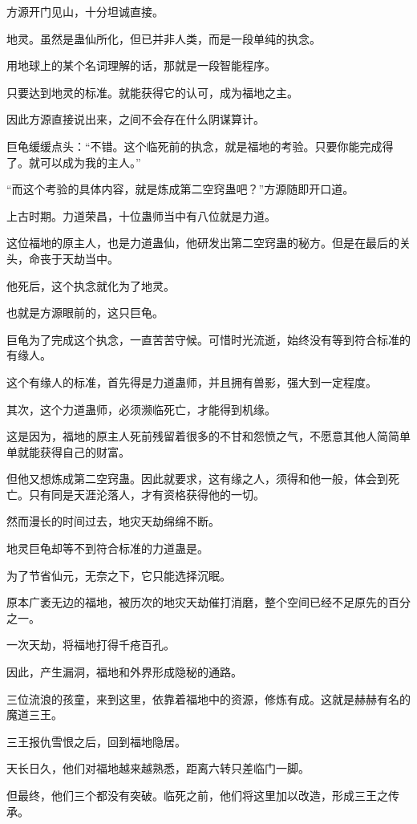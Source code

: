 \begin{this_body}
方源开门见山，十分坦诚直接。

地灵。虽然是蛊仙所化，但已并非人类，而是一段单纯的执念。

用地球上的某个名词理解的话，那就是一段智能程序。

只要达到地灵的标准。就能获得它的认可，成为福地之主。

因此方源直接说出来，之间不会存在什么阴谋算计。

巨龟缓缓点头：“不错。这个临死前的执念，就是福地的考验。只要你能完成得了。就可以成为我的主人。”

“而这个考验的具体内容，就是炼成第二空窍蛊吧？”方源随即开口道。

上古时期。力道荣昌，十位蛊师当中有八位就是力道。

这位福地的原主人，也是力道蛊仙，他研发出第二空窍蛊的秘方。但是在最后的关头，命丧于天劫当中。

他死后，这个执念就化为了地灵。

也就是方源眼前的，这只巨龟。

巨龟为了完成这个执念，一直苦苦守候。可惜时光流逝，始终没有等到符合标准的有缘人。

这个有缘人的标准，首先得是力道蛊师，并且拥有兽影，强大到一定程度。

其次，这个力道蛊师，必须濒临死亡，才能得到机缘。

这是因为，福地的原主人死前残留着很多的不甘和怨愤之气，不愿意其他人简简单单就能获得自己的财富。

但他又想炼成第二空窍蛊。因此就要求，这有缘之人，须得和他一般，体会到死亡。只有同是天涯沦落人，才有资格获得他的一切。

然而漫长的时间过去，地灾天劫绵绵不断。

地灵巨龟却等不到符合标准的力道蛊是。

为了节省仙元，无奈之下，它只能选择沉眠。

原本广袤无边的福地，被历次的地灾天劫催打消磨，整个空间已经不足原先的百分之一。

一次天劫，将福地打得千疮百孔。

因此，产生漏洞，福地和外界形成隐秘的通路。

三位流浪的孩童，来到这里，依靠着福地中的资源，修炼有成。这就是赫赫有名的魔道三王。

三王报仇雪恨之后，回到福地隐居。

天长日久，他们对福地越来越熟悉，距离六转只差临门一脚。

但最终，他们三个都没有突破。临死之前，他们将这里加以改造，形成三王之传承。


\end{this_body}
